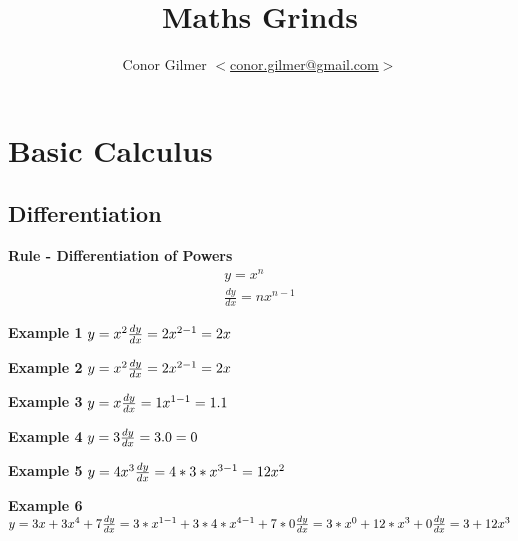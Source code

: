 \documentclass{article}
\title{\gmat{} Maths Grinds}
\author{Conor Gilmer $<$\href{mailto:conor.gilmer@gmail.com}{conor.gilmer@gmail.com}$>$}
\begin{document}
\section{Basic Calculus}
\subsection{Differentiation}
\textbf{Rule - Differentiation of Powers}
\begin{equation}
\begin{split}
y = x^{n} \\
\frac{dy}{dx} = nx^{n-1}
\end{split}
\end{equation}




\textbf{Example 1}
$y = x^{2}\\
\frac{dy}{dx} = 2x^{2-1} = 2x
$


\textbf{Example 2}
$y = x^{2}\\
\frac{dy}{dx} = 2x^{2-1} = 2x
$


\textbf{Example 3}
$y = x\\
\frac{dy}{dx} = 1x^{1-1} = 1.1
$

\textbf{Example 4}
$y = 3\\
\frac{dy}{dx} = 3.0 = 0
$

\textbf{Example 5}
$y = 4x^{3}\\
\frac{dy}{dx} = 4*3*x^{3-1} = 12x^{2}
$


\textbf{Example 6}
$y = 3x + 3x^{4} + 7\\
\frac{dy}{dx} = 3*x^{1-1} + 3*4*x^{4-1} + 7 * 0 \\
\frac{dy}{dx} = 3*x^{0} + 12*x^{3} + 0\\
\frac{dy}{dx} = 3 + 12x^{3} \\
$
\end{document}
